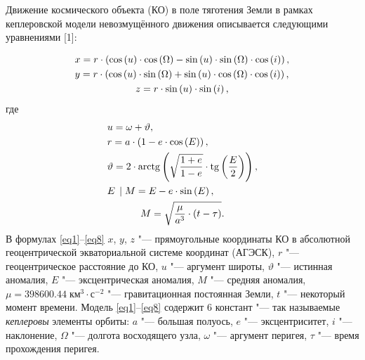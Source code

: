 
\vzmscaption


Движение космического объекта (КО) в поле тяготения Земли в рамках кеплеровской модели невозмущённого движения описывается следующими уравнениями [1]:

\vskip-7mm
\begin{gather}
\label{eq1}
  x = r \cdot \left( {\cos \left( u \right) \cdot \cos \left( \Omega  \right) - \sin \left( u \right) \cdot \sin \left( \Omega  \right) \cdot \cos \left( i \right)} \right), \hfill \\
\label{eq2}
  y = r \cdot \left( {\cos \left( u \right) \cdot \sin \left( \Omega  \right) + \sin \left( u \right) \cdot \cos \left( \Omega  \right) \cdot \cos \left( i \right)} \right), \hfill \\
\label{eq3}
  z = r \cdot \sin \left( u \right) \cdot \sin \left( i \right),
\end{gather}
\vskip-5mm
\noindent
где
\vskip-7mm
\begin{gather}
\label{eq4}
  u = \omega  + \vartheta , \hfill \\
\label{eq5}
  r = a \cdot \left( {1 - e \cdot \cos \left( E \right)} \right), \hfill \\
\label{eq6}
  \vartheta  = 2 \cdot \operatorname{arctg} \left( {\sqrt {\frac{{1 + e}}{{1 - e}}}  \cdot \operatorname{tg}\left( {\frac{E}{2}} \right)} \right),\hfill \\
\label{eq7}
  E\;\left| {\;M = E - e \cdot \sin \left( E \right),} \right. \hfill \\
\label{eq8}
  M = \sqrt {\frac{\mu }{{{a^3}}} \cdot \left( {t - \tau } \right)} .
\end{gather}
\vskip-3mm
В формулах \eqref{eq1}--\eqref{eq8}
$x$, $y$, $z$ "--- прямоугольные координаты КО в абсолютной геоцентрической экваториальной системе координат (АГЭСК),
$r$ "--- геоцентрическое расстояние до КО,
$u$ "--- аргумент широты,
$\vartheta $ "--- истинная аномалия,
$E$ "--- эксцентрическая аномалия,
$M$ "--- средняя аномалия,
$\mu  = 398600.44\;\text{км}^3 \cdot \text{с}^ {- 2}$ "--- гравитационная постоянная Земли,
$t$ "--- некоторый момент времени. Модель \eqref{eq1}--\eqref{eq8} содержит 6 констант "--- так называемые \textit{кеплеровы} элементы орбиты:
$a$ "--- большая полуось,
$e$ "--- эксцентриситет,
$i$ "--- наклонение,
$\Omega$ "--- долгота восходящего узла,
$\omega$ "--- аргумент перигея,
$\tau$ "--- время прохождения перигея.

